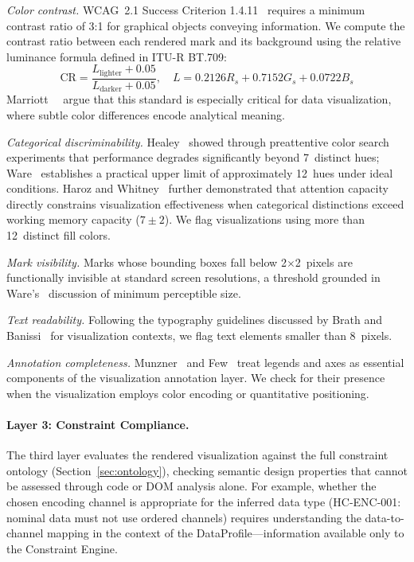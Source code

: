 \textit{Color contrast.} WCAG~2.1 Success Criterion 1.4.11~\cite{wcag21} requires a minimum contrast ratio of 3:1 for graphical objects conveying information. We compute the contrast ratio between each rendered mark and its background using the relative luminance formula defined in ITU-R BT.709:
\begin{equation}
  \text{CR} = \frac{L_{\text{lighter}} + 0.05}{L_{\text{darker}} + 0.05}, \quad
  L = 0.2126 R_s + 0.7152 G_s + 0.0722 B_s
\end{equation}
Marriott~\etal{}~\cite{marriott2021inclusive} argue that this standard is especially critical for data visualization, where subtle color differences encode analytical meaning.

\textit{Categorical discriminability.} Healey~\cite{healey1996choosing} showed through preattentive color search experiments that performance degrades significantly beyond 7~distinct hues; Ware~\cite{ware2004information} establishes a practical upper limit of approximately 12~hues under ideal conditions. Haroz and Whitney~\cite{haroz2012capacity} further demonstrated that attention capacity directly constrains visualization effectiveness when categorical distinctions exceed working memory capacity ($7 \pm 2$). We flag visualizations using more than 12~distinct fill colors.

\textit{Mark visibility.} Marks whose bounding boxes fall below 2$\times$2~pixels are functionally invisible at standard screen resolutions, a threshold grounded in Ware's~\cite{ware2004information} discussion of minimum perceptible size.

\textit{Text readability.} Following the typography guidelines discussed by Brath and Banissi~\cite{brath2016typography} for visualization contexts, we flag text elements smaller than 8~pixels.

\textit{Annotation completeness.} Munzner~\cite{munzner2014visualization} and Few~\cite{few2012show} treat legends and axes as essential components of the visualization annotation layer. We check for their presence when the visualization employs color encoding or quantitative positioning.

\paragraph{Layer 3: Constraint Compliance.}
The third layer evaluates the rendered visualization against the full constraint ontology (Section~\ref{sec:ontology}), checking semantic design properties that cannot be assessed through code or DOM analysis alone. For example, whether the chosen encoding channel is appropriate for the inferred data type (HC-ENC-001: nominal data must not use ordered channels) requires understanding the data-to-channel mapping in the context of the DataProfile---information available only to the Constraint Engine.

